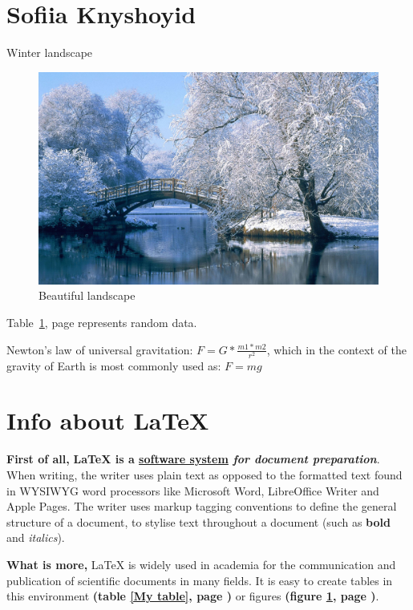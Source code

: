 \section{Sofiia Knyshoyid}
\label{sec:Sofiia_knyshoyid}

Winter landscape

\begin{figure}[htbp]
    \centering
    \includegraphics[width=1\textwidth]{pictures/winter_img.jpg}
    \caption{Beautiful landscape}
    \label{fig:winter}
\end{figure}

Table~\ref{sec:Sofiia_knyshoyid}, page \pageref{sec:Sofiia_knyshoyid} represents random data.



Newton’s law of universal gravitation: \(F=G*\frac{m1*m2}{r^{2}}\), which in the context of the gravity of Earth is most commonly used as:
\(F=mg\)


\newpage
\begingroup
\centering 
\section*{Info about \LaTeX{}}
\textbf{First of all,} \textbf{\LaTeX{} is a \underline{software system} \emph{for document preparation}}.  When writing, the writer uses plain text as opposed to the formatted text found in WYSIWYG word processors like Microsoft Word, LibreOffice Writer and Apple Pages. The writer uses markup tagging conventions to define the general structure of a document, to stylise text throughout a document (such as \textbf{bold} and \textit{italics}).

\noindent \textbf{What is more,} \LaTeX{}
is widely used in academia for the communication
and publication of scientific documents
in many fields.
It is easy to create tables 
in this environment \textbf{(table \ref{My table}, 
page \pageref{My table})}
or figures 
\textbf{(figure \ref{fig:winter}, page \pageref{fig:winter})}.

